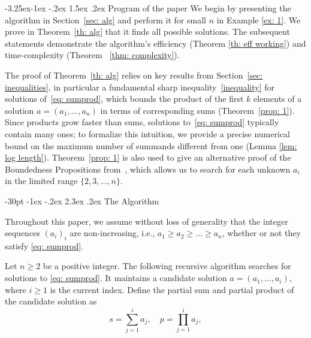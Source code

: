 \documentclass[10pt]{article}
\makeatletter
\renewcommand\section{\@startsection {section}{1}{\z@}
  {-30pt \@plus -1ex \@minus -.2ex}
  {2.3ex \@plus .2ex}
  {\normalfont\normalsize\bfseries\boldmath}}
\renewcommand\subsection{\@startsection{subsection}{2}{\z@}
  {-3.25ex\@plus -1ex \@minus -.2ex}
  {1.5ex \@plus .2ex}
  {\normalfont\normalsize\bfseries\boldmath}}
\theoremstyle{definition}
\theoremstyle{remark}
\numberwithin{equation}{section}
\makeatother
\begin{document}
\subsection{Program of the paper}
We begin by presenting the algorithm in Section~\ref{sec: alg} and perform it for small $n$ in Example \ref{ex: 1}. We prove in Theorem~\ref{th: alg} that it finds all possible solutions. The subsequent statements demonstrate the algorithm's efficiency (Theorem \ref{th: eff working}) and time-complexity (Theorem ~\ref{thm: complexity}).

The proof of Theorem~\ref{th: alg} relies on key results from Section~\ref{sec: inequalities}, in particular a fundamental sharp inequality~\eqref{inequality} for solutions of~\eqref{eq: sumprod}, which bounds the product of the first $k$ elements of a solution $a = (a_1, \dots, a_n)$ in terms of corresponding sums (Theorem~\ref{prop: 1}). Since products grow faster than sums, solutions to~\eqref{eq: sumprod} typically contain many ones; to formalize this intuition, we provide a precise numerical bound on the maximum number of summands different from one (Lemma \ref{lem: log length}). Theorem~\ref{prop: 1} is also used to give an alternative proof of the Boundedness Propositions from~\cite{ecker}, which allows us to search for each unknown $a_i$ in the limited range $\{2,3,\dots,n\}$.




\section{The Algorithm}\label{sec: alg}

Throughout this paper, we assume without loss of generality that the integer sequences $(a_i)_i$ are non-increasing, i.e., $a_1 \geq a_2 \geq \dots \geq a_n$, whether or not they satisfy \eqref{eq: sumprod}. 

Let $n\geq 2$ be a positive integer. The following recursive algorithm searches for solutions to \eqref{eq: sumprod}. It maintains a candidate solution $a = (a_1, \dots, a_i)$, where $i \geq 1$ is the current index. Define the partial sum and partial product of the candidate solution as
\[
s = \sum_{j=1}^i a_j, \quad p = \prod_{j=1}^i a_j,
\]
\end{document}
